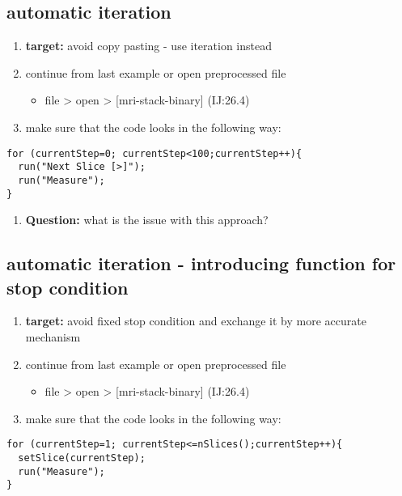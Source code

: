 \documentclass[11pt]{article}
\begin{document}
\subsection{automatic iteration}
\label{sec-7-3}
\begin{enumerate}
\item \textbf{target:} avoid copy pasting - use iteration instead
\item continue from last example or open preprocessed file
\begin{itemize}
\item file > open > [mri-stack-binary] (IJ:26.4)
\end{itemize}
\item make sure that the code looks in the following way:
\end{enumerate}
\begin{verbatim}
for (currentStep=0; currentStep<100;currentStep++){
  run("Next Slice [>]");
  run("Measure");
}
\end{verbatim}
\begin{enumerate}
\item \textbf{Question:} what is the issue with this approach?
\end{enumerate}

\subsection{automatic iteration - introducing function for stop condition}
\label{sec-7-4}
\begin{enumerate}
\item \textbf{target:} avoid fixed stop condition and exchange it by more
accurate mechanism
\item continue from last example or open preprocessed file
\begin{itemize}
\item file > open > [mri-stack-binary] (IJ:26.4)
\end{itemize}
\item make sure that the code looks in the following way:
\end{enumerate}
\begin{verbatim}
for (currentStep=1; currentStep<=nSlices();currentStep++){
  setSlice(currentStep);
  run("Measure");
}
\end{verbatim}
\end{document}
